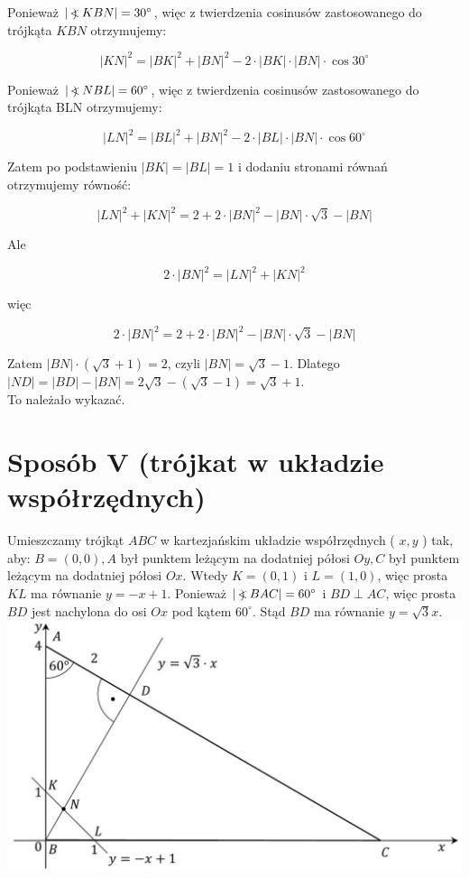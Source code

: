 \documentclass[10pt]{article}
\newcommand\Varangle{\mathop{{<\!\!\!\!\!\text{\small)}}\:}\nolimits}
\begin{document}
Ponieważ $|\Varangle K B N|=30^{\circ}$, więc z twierdzenia cosinusów zastosowanego do trójkąta $K B N$ otrzymujemy:

$$
|K N|^{2}=|B K|^{2}+|B N|^{2}-2 \cdot|B K| \cdot|B N| \cdot \cos 30^{\circ}
$$

Ponieważ $|\Varangle N B L|=60^{\circ}$, więc z twierdzenia cosinusów zastosowanego do trójkąta BLN otrzymujemy:

$$
|L N|^{2}=|B L|^{2}+|B N|^{2}-2 \cdot|B L| \cdot|B N| \cdot \cos 60^{\circ}
$$

Zatem po podstawieniu $|B K|=|B L|=1$ i dodaniu stronami równań otrzymujemy równość:

$$
|L N|^{2}+|K N|^{2}=2+2 \cdot|B N|^{2}-|B N| \cdot \sqrt{3}-|B N|
$$

Ale

$$
2 \cdot|B N|^{2}=|L N|^{2}+|K N|^{2}
$$

więc

$$
2 \cdot|B N|^{2}=2+2 \cdot|B N|^{2}-|B N| \cdot \sqrt{3}-|B N|
$$

Zatem $|B N| \cdot(\sqrt{3}+1)=2$, czyli $|B N|=\sqrt{3}-1$. Dlatego\\
$|N D|=|B D|-|B N|=2 \sqrt{3}-(\sqrt{3}-1)=\sqrt{3}+1$.\\
To należało wykazać.

\section*{Sposób V (trójkat w układzie współrzędnych)}
Umieszczamy trójkąt $A B C$ w kartezjańskim układzie współrzędnych ( $x, y$ ) tak, aby: $B=(0,0), A$ był punktem leżącym na dodatniej półosi $O y, C$ był punktem leżącym na dodatniej półosi $O x$. Wtedy $K=(0,1)$ i $L=(1,0)$, więc prosta $K L$ ma równanie $y=-x+1$. Ponieważ $|\Varangle B A C|=60^{\circ}$ i $B D \perp A C$, więc prosta $B D$ jest nachylona do osi $O x$ pod kątem $60^{\circ}$. Stąd $B D$ ma równanie $y=\sqrt{3} x$.\\
\includegraphics[max width=\textwidth, center]{2025_02_07_dcb3d059df06a3930b0ag-11}
\end{document}
